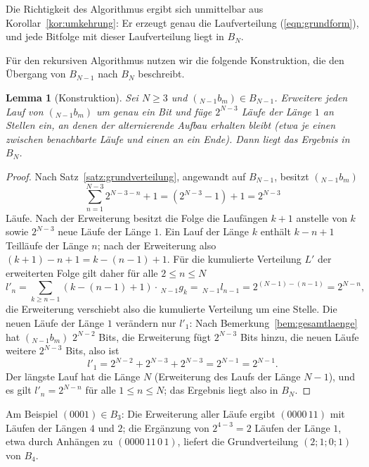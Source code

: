 \documentclass[11pt,a4paper]{scrartcl}
\theoremstyle{plain}
\newtheorem{lemma}[satz]{Lemma}
\theoremstyle{definition}
\theoremstyle{remark}
\begin{document}
\noindent Die Richtigkeit des Algorithmus ergibt sich unmittelbar aus
Korollar~\ref{kor:umkehrung}: Er erzeugt genau die Laufverteilung
(\ref{eqn:grundform}), und jede Bitfolge mit dieser Laufverteilung
liegt in $B_N$.

\noindent Für den rekursiven Algorithmus nutzen wir die folgende
Konstruktion, die den Übergang von $B_{N-1}$ nach $B_N$ beschreibt.

\begin{lemma}[Konstruktion]\label{lem:konstruktion}
Sei $N\geq 3$ und $({}_{N-1}b_m)\in B_{N-1}$. Erweitere jeden Lauf von
$({}_{N-1}b_m)$ um genau ein Bit und füge $2^{N-3}$ Läufe der Länge $1$
an Stellen ein, an denen der alternierende Aufbau erhalten bleibt (etwa
je einen zwischen benachbarte Läufe und einen an ein Ende). Dann liegt
das Ergebnis in $B_N$.
\end{lemma}

\begin{proof}
Nach Satz~\ref{satz:grundverteilung}, angewandt auf $B_{N-1}$, besitzt
$({}_{N-1}b_m)$
\begin{equation*}
  \sum_{n=1}^{N-3}2^{N-3-n}+1=\left(2^{N-3}-1\right)+1=2^{N-3}
\end{equation*}
Läufe. Nach der Erweiterung besitzt die Folge die Laufängen $k+1$
anstelle von $k$ sowie $2^{N-3}$ neue Läufe der Länge $1$. Ein Lauf
der Länge $k$ enthält $k-n+1$ Teilläufe der Länge $n$; nach der
Erweiterung also $(k+1)-n+1=k-(n-1)+1$. Für die kumulierte Verteilung
$L'$ der erweiterten Folge gilt daher für alle $2\leq n\leq N$
\begin{equation*}
  l'_n=\sum_{k\geq n-1}\left(k-(n-1)+1\right)\cdot\,_{N-1}g_k
  =\,_{N-1}l_{n-1}=2^{(N-1)-(n-1)}=2^{N-n},
\end{equation*}
die Erweiterung verschiebt also die kumulierte Verteilung um eine
Stelle. Die neuen Läufe der Länge $1$ verändern nur $l'_1$: Nach
Bemerkung~\ref{bem:gesamtlaenge} hat $({}_{N-1}b_m)$ $2^{N-2}$ Bits,
die Erweiterung fügt $2^{N-3}$ Bits hinzu, die neuen Läufe weitere
$2^{N-3}$ Bits, also ist
\begin{equation*}
  l'_1=2^{N-2}+2^{N-3}+2^{N-3}=2^{N-1}=2^{N-1}.
\end{equation*}
Der längste Lauf hat die Länge $N$ (Erweiterung des Laufs der Länge
$N-1$), und es gilt $l'_n=2^{N-n}$ für alle $1\leq n\leq N$; das
Ergebnis liegt also in $B_N$.
\end{proof}

\noindent Am Beispiel $(0001)\in B_3$: Die Erweiterung aller Läufe
ergibt $(0000\,11)$ mit Läufen der Längen $4$ und $2$; die Ergänzung
von $2^{4-3}=2$ Läufen der Länge $1$, etwa durch Anhängen zu
$(0000\,11\,0\,1)$, liefert die Grundverteilung $(2;1;0;1)$ von $B_4$.
\end{document}
